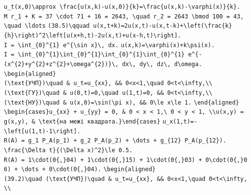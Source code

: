 \documentclass[
  ukrainian,
]{article}
\begin{document}
\texttt{u\_t(x,0)\textbackslash{}approx\ \textbackslash{}frac\{u(x,k)-u(x,0)\}\{k\}=\textbackslash{}frac\{u(x,k)-\textbackslash{}varphi(x)\}\{k\}.}
\texttt{M\ r\_1\ +\ K\ =\ 37\ \textbackslash{}cdot\ 71\ +\ 16\ =\ 2643,\ \textbackslash{}quad\ r\_2\ =\ 2643\ \textbackslash{}bmod\ 100\ =\ 43,\ \textbackslash{}quad\ \textbackslash{}ldots}
\texttt{(38.5)\textbackslash{}qquad\ u(x,t+k)=2u(x,t)-u(x,t-k)+\textbackslash{}left(\textbackslash{}frac\{k\}\{h\}\textbackslash{}right)\^{}2\textbackslash{}left{[}u(x+h,t)-2u(x,t)+u(x-h,t)\textbackslash{}right{]}.}
\texttt{I\ =\ \textbackslash{}int\_\{0\}\^{}\{1\}\ e\^{}\{\textbackslash{}sin\ x\}\textbackslash{},\ dx.}
\texttt{u(x,k)=\textbackslash{}varphi(x)+k\textbackslash{}psi(x).}
\texttt{I\ =\ \textbackslash{}int\_\{0\}\^{}\{1\}\textbackslash{}int\_\{0\}\^{}\{1\}\textbackslash{}int\_\{0\}\^{}\{1\}\textbackslash{}int\_\{0\}\^{}\{1\}\ e\^{}\{-(x\^{}\{2\}+y\^{}\{2\}+z\^{}\{2\}+\textbackslash{}omega\^{}\{2\})\}\textbackslash{},\ dx\textbackslash{},\ dy\textbackslash{},\ dz\textbackslash{},\ d\textbackslash{}omega.}
\texttt{\textbackslash{}begin\{aligned\}}
\texttt{(\textbackslash{}text\{УЧП\})\textbackslash{}quad\ \&\ u\_t=u\_\{xx\},\ \&\&\ 0\textless{}x\textless{}1,\textbackslash{}quad\ 0\textless{}t\textless{}\textbackslash{}infty,\textbackslash{}\textbackslash{}}
\texttt{(\textbackslash{}text\{ГУ\})\textbackslash{}quad\ \&\ u(0,t)=0,\textbackslash{}quad\ u(1,t)=0,\ \&\&\ 0\textless{}t\textless{}\textbackslash{}infty,\textbackslash{}\textbackslash{}}
\texttt{(\textbackslash{}text\{НУ\})\textbackslash{}quad\ \&\ u(x,0)=\textbackslash{}sin(\textbackslash{}pi\ x),\ \&\&\ 0\textbackslash{}le\ x\textbackslash{}le\ 1.}
\texttt{\textbackslash{}end\{aligned\}}
\texttt{\textbackslash{}begin\{cases\}u\_\{xx\}\ +\ u\_\{yy\}\ =\ 0,\ \&\ 0\ \textless{}\ x\ \textless{}\ 1,\textbackslash{}\ 0\ \textless{}\ y\ \textless{}\ 1,\ \textbackslash{}\textbackslash{}u(x,y)\ =\ g(x,y),\ \&\ \textbackslash{}text\{на\ межі\ квадрата.\}\textbackslash{}end\{cases\}}
\texttt{u\_x(1,t)=-\textbackslash{}left{[}u(1,t)-1\textbackslash{}right{]}.}
\texttt{R(A)\ =\ g\_1\ P\_A(p\_1)\ +\ g\_2\ P\_A(p\_2)\ +\ \textbackslash{}dots\ +\ g\_\{12\}\ P\_A(p\_\{12\}).}
\texttt{\textbackslash{}frac\{\textbackslash{}Delta\ t\}\{(\textbackslash{}Delta\ x)\^{}2\}\textbackslash{}le\ 0.5.}
\texttt{R(A)\ =\ 1\textbackslash{}cdot(0\{,\}04)\ +\ 1\textbackslash{}cdot(0\{,\}15)\ +\ 1\textbackslash{}cdot(0\{,\}03)\ +\ 0\textbackslash{}cdot(0\{,\}06)\ +\ \textbackslash{}dots\ +\ 0\textbackslash{}cdot(0\{,\}04).}
\texttt{\textbackslash{}begin\{aligned\}}
\texttt{(39.2)\textbackslash{}quad\ (\textbackslash{}text\{УЧП\})\textbackslash{}quad\ \&\ u\_t=u\_\{xx\},\ \&\&\ 0\textless{}x\textless{}1,\textbackslash{}quad\ 0\textless{}t\textless{}\textbackslash{}infty,\textbackslash{}\textbackslash{}}
\end{document}
